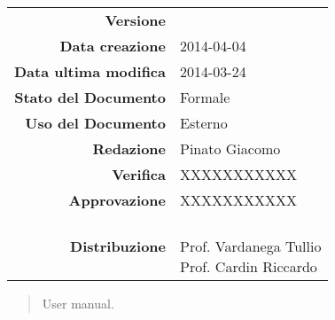


\newcommand{\Versione}{\versioneManualeUtente{}} %
\newcommand{\Data}{2014-04-04}				     %
\newcommand{\DataUltimaModifica}{2014-03-24}
\newcommand{\TipoDocumento}{User Manual}	 	%



\begin{center}
\begin{tabular}{r|l}
\textbf{Versione} & \Versione{} \\
\textbf{Data creazione} & \Data{} \\
\textbf{Data ultima modifica} & \DataUltimaModifica{} \\
\textbf{Stato del Documento} & Formale \\		          %
\textbf{Uso del Documento} & Esterno \\			          %
\textbf{Redazione} &  Pinato Giacomo\\
\textbf{Verifica} & XXXXXXXXXXX\\  %
\textbf{Approvazione} & XXXXXXXXXXX\\				      %
\textbf{Distribuzione} & \parbox[t]{4cm}{\NomeGruppo{}\\Prof. Vardanega Tullio\\Prof. Cardin Riccardo\\ \Prop{} }\\
\end{tabular}
\end{center}

\vspace{0.05in}

\begin{abstract}
\begin{center}
\Progetto{} User manual.
\end{center}
\end{abstract}

